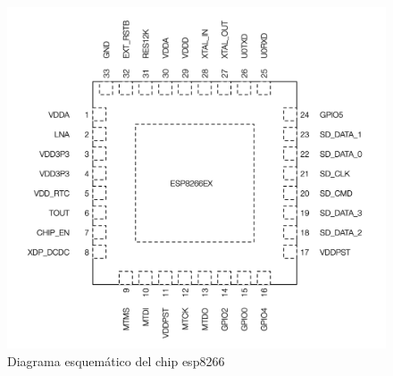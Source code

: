 \begin{figure}[H]
	\centering
	\includegraphics[scale=.25]{Capitulo2/images/esp8266.png}
	\caption{Diagrama esquemático del chip esp8266}
	\label{fig:diagrama_dispensador}
\end{figure}

\pagebreak

